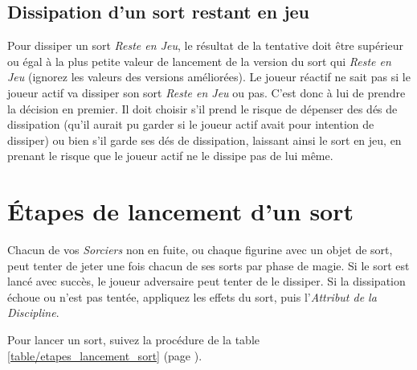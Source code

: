 \subsection{Dissipation d'un sort restant en jeu}

 Pour dissiper un sort \emph{Reste en Jeu}, le résultat de la tentative doit être supérieur ou égal à la plus petite valeur de lancement de la version du sort qui \emph{Reste en Jeu} (ignorez les valeurs des versions améliorées).
Le joueur réactif ne sait pas si le joueur actif va dissiper son sort \emph{Reste en Jeu} ou pas. C'est donc à lui de prendre la décision en premier. Il doit choisir s'il prend le risque de dépenser des dés de dissipation (qu'il aurait pu garder si le joueur actif avait pour intention de dissiper) ou bien s'il garde ses dés de dissipation, laissant ainsi le sort en jeu, en prenant le risque que le joueur actif ne le dissipe pas de lui même.


\section{Étapes de lancement d'un sort}
\label{lancement_sort}

Chacun de vos \emph{Sorciers} non en fuite, ou chaque figurine avec un objet de sort, peut tenter de jeter une fois chacun de ses sorts par phase de magie. Si le sort est lancé avec succès, le joueur adversaire peut tenter de le dissiper. Si la dissipation échoue ou n'est pas tentée, appliquez les effets du sort, puis l'\emph{Attribut de la Discipline}.

Pour lancer un sort, suivez la procédure de la table \ref{table/etapes_lancement_sort} (page \pageref{table/etapes_lancement_sort}).

